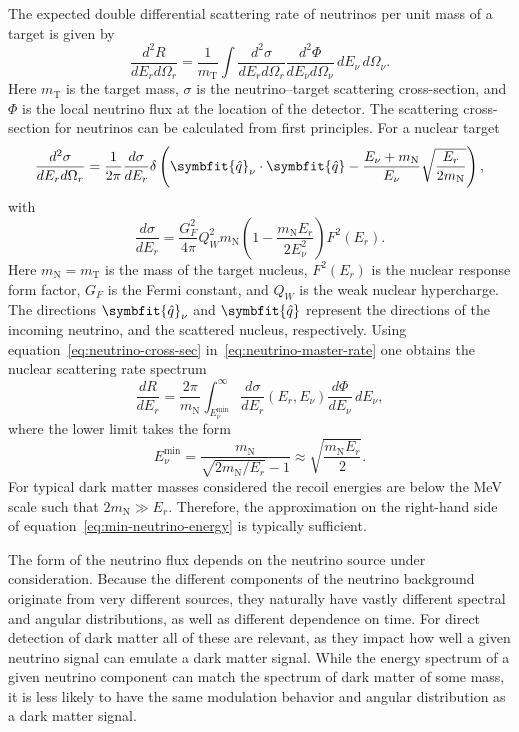 \documentclass[b5paper, 10pt, twoside]{book}
\newcommand{\der}[2]{\frac{d#1}{d#2}}
\newcommand{\ddder}[3]{\frac{d^2#1}{d#2d#3}}
\newcommand{\unitv}[1]{\symbfit{\hat{#1}}}
\newcommand{\difd}{\,d}
\begin{document}
The expected double differential scattering rate of neutrinos per unit mass of a target is given by
\begin{equation}
    \ddder{R}{E_r}{\Omega_r}=\frac{1}{m_\text{T}}\int\ddder{\sigma}{E_r}{\Omega_r}\ddder{\Phi}{E_\nu}{\Omega_\nu}\difd E_\nu\difd\Omega_\nu.
    \label{eq:neutrino-master-rate}
\end{equation}
Here $m_\text{T}$ is the target mass, $\sigma$ is the neutrino--target scattering cross-section, and $\Phi$ is the local neutrino flux at the location of the detector. The scattering cross-section for neutrinos can be calculated from first principles. For a nuclear target
\begin{equation}
    \ddder{\sigma}{E_r}{\Omega_r}=\frac{1}{2\pi}\der{\sigma}{E_r}\delta\left(\unitv{q}_\nu\cdot\unitv{q}-\frac{E_\nu+m_\text{N}}{E_\nu}\sqrt{\frac{E_r}{2m_\text{N}}}\right),
    \label{eq:neutrino-cross-sec}
\end{equation}
with
\begin{equation}
    \der{\sigma}{E_r}=\frac{G_F^2}{4\pi}Q_W^2m_\text{N}\left(1-\frac{m_\text{N}E_r}{2E_\nu^2}\right)F^2(E_r).
\end{equation}
Here $m_\text{N}=m_\text{T}$ is the mass of the target nucleus, $F^2(E_r)$ is the nuclear response form factor, $G_F$ is the Fermi constant, and $Q_W$ is the weak nuclear hypercharge. The directions $\unitv{q}_\nu$ and $\unitv{q}$ represent the directions of the incoming neutrino, and the scattered nucleus, respectively. Using equation~\eqref{eq:neutrino-cross-sec} in~\eqref{eq:neutrino-master-rate} one obtains the nuclear scattering rate spectrum
\begin{equation}
    \der{R}{E_r}=\frac{2\pi}{m_\text{N}}\int_{E_\nu^\text{min}}^\infty\der{\sigma}{E_r}(E_r,E_\nu)\der{\Phi}{E_\nu}\difd E_\nu,
\end{equation}
where the lower limit takes the form
\begin{equation}
    E_\nu^\text{min}=\frac{m_\text{N}}{\sqrt{2m_\text{N}/E_r}-1}\approx\sqrt{\frac{m_\text{N}E_r}{2}}.
    \label{eq:min-neutrino-energy}
\end{equation}
For typical dark matter masses considered the recoil energies are below the MeV scale such that $2m_\text{N}\gg E_r$. Therefore, the approximation on the right-hand side of equation~\eqref{eq:min-neutrino-energy} is typically sufficient.

The form of the neutrino flux depends on the neutrino source under consideration. Because the different components of the neutrino background originate from very different sources, they naturally have vastly different spectral and angular distributions, as well as different dependence on time. For direct detection of dark matter all of these are relevant, as they impact how well a given neutrino signal can emulate a dark matter signal. While the energy spectrum of a given neutrino component can match the spectrum of dark matter of some mass, it is less likely to have the same modulation behavior and angular distribution as a dark matter signal.
\end{document}

